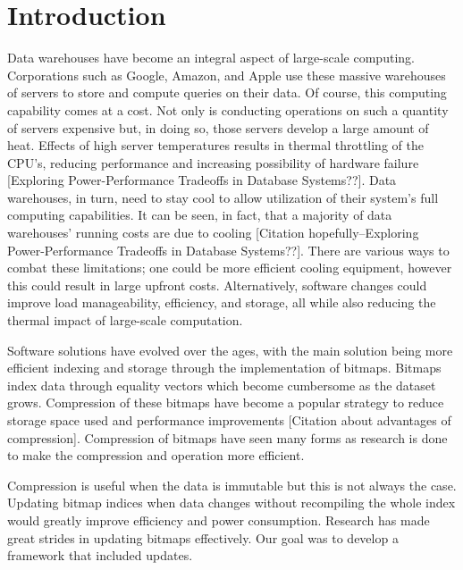 \documentclass{article}
\begin{document}
\section{Introduction}
Data warehouses have become an integral aspect of large-scale computing. Corporations such as Google, Amazon, and Apple use these massive warehouses of servers to store and compute queries on their data. Of course, this computing capability comes at a cost. Not only is conducting operations on such a quantity of servers expensive but, in doing so, those servers develop a large amount of heat. Effects of high server temperatures results in thermal throttling of the CPU's, reducing performance and increasing possibility of hardware failure [Exploring Power-Performance Tradeoffs in Database Systems??].
Data warehouses, in turn, need to stay cool to allow utilization of their system's full computing capabilities. It can be seen, in fact, that a majority of data warehouses' running costs are due to cooling [Citation hopefully--Exploring Power-Performance Tradeoffs in Database Systems??].
There are various ways to combat these limitations; one could be more efficient cooling equipment, however this could result in large upfront costs. Alternatively, software changes could improve load manageability, efficiency, and storage, all while also reducing the thermal impact of large-scale computation.
\par
Software solutions have evolved over the ages, with the main solution being more efficient indexing and storage through the implementation of bitmaps. Bitmaps index data through equality vectors which become cumbersome as the dataset grows.  %
Compression of these bitmaps have become a popular strategy to reduce storage space used and performance improvements [Citation about advantages of compression]. Compression of bitmaps have seen many forms as research is done to make the compression and operation more efficient. 
\par 
Compression is useful when the data is immutable but this is not always the case. Updating bitmap indices when data changes without recompiling the whole index would greatly improve efficiency and power consumption. Research has made great strides in updating bitmaps effectively. Our goal was to develop a framework that included updates. 
%
%
\end{document}
